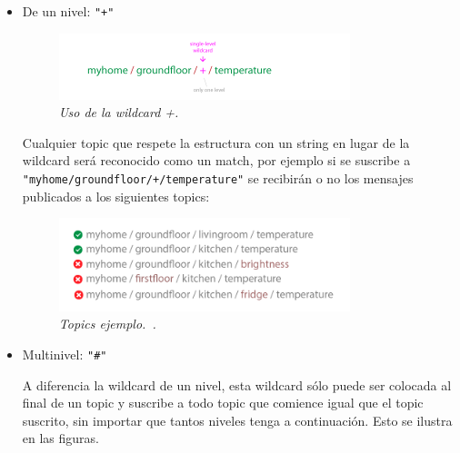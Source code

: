 \begin{itemize}

\item De un nivel: \lstinline[columns=fixed]{"+"} ~

\begin{figure}[h!]
  \centering
  \includegraphics[width=0.8\textwidth, keepaspectratio]{images/topic-wildcard-plus}
  \caption{\textit{Uso de la wildcard +. ~\cite{MQTTEssentials5}}}
  \label{fig:topic-wildcard-plus}
\end{figure}

Cualquier topic que respete la estructura con un string en lugar de la wildcard será reconocido como un match, por ejemplo si se suscribe a \lstinline[columns=fixed]{"myhome/groundfloor/+/temperature"} se recibirán o no los mensajes publicados a los siguientes topics:

\begin{figure}[h!]
  \centering
  \includegraphics[width=0.8\textwidth, keepaspectratio]{images/topic-wildcard-plus-example}
  \caption{\textit{Topics ejemplo.~\cite{MQTTEssentials5}.}}
  \label{fig:topic-wildcard-plus-example}
\end{figure}

\item Multinivel: \lstinline[columns=fixed]{"#"}

A diferencia la wildcard de un nivel, esta wildcard sólo puede ser colocada al final de un topic y suscribe a todo topic que comience igual que el topic suscrito, sin importar que tantos niveles tenga a continuación. Esto se ilustra en las figuras. ~

\begin{figure}[H]
  \centering


\end{figure}
\end{itemize}
